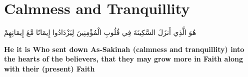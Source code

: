 \chapter{Calmness and Tranquillity}
\begin{center}
    {\Huge    
        \begin{Arabic}
            هُوَ الَّذِي أَنزَلَ السَّكِينَةَ فِي قُلُوبِ الْمُؤْمِنِينَ لِيَزْدَادُوا إِيمَانًا مَّعَ إِيمَانِهِمْ
        \end{Arabic}
    }
\end{center}
\vspace*{\fill}
\vspace{3cm}
\begin{center}
    \large \textbf{He it is Who sent down As-Sakinah (calmness and tranquillity) into the hearts of the believers, that they may grow more in Faith along with their (present) Faith}
\end{center}
